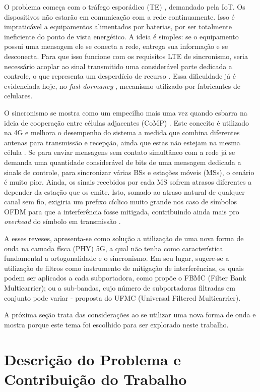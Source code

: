 \par O problema começa com o tráfego esporádico (TE) \cite{Wild}, demandado pela IoT. Os dispositivos não estarão em comunicação com a rede continuamente. Isso é impraticável a equipamentos alimentados por baterias, por ser totalmente ineficiente do ponto de vista energético. A ideia é simples: se o equipamento possui uma mensagem ele se conecta a rede, entrega sua informação e se desconecta. Para que isso funcione com os requisitos LTE de sincronismo, seria necessário acoplar ao sinal transmitido uma considerável parte dedicada a controle, o que representa um desperdício de recurso \cite{Wunder}. Essa dificuldade já é evidenciada hoje, no \textit{fast dormancy} \cite{Zhao}, mecanismo utilizado por fabricantes de celulares.    
\par O sincronismo se mostra como um empecilho mais uma vez quando esbarra na ideia de cooperação entre células adjacentes (CoMP) \cite{Wunder}. Este conceito é utilizado na 4G e melhora o desempenho do sistema a medida que combina diferentes antenas para transmissão e recepção, ainda que estas não estejam na mesma célula \cite{DLee}. Se para enviar mensagens sem contato simultâneo com a rede já se demanda uma quantidade considerável de bits de uma mensagem dedicada a sinals de controle, para sincronizar várias BSs e estações móveis (MSs), o cenário é muito pior. Ainda, os sinais recebidos por cada MS sofrem atrasos diferentes a depender da estação que os emite. Isto, somado ao atraso natural de qualquer canal sem fio, exigiria um prefixo cíclico muito grande nos caso de símbolos OFDM para que a interferência fosse mitigada, contribuindo ainda mais pro \textit{overhead} do símbolo em transmissão \cite{Wunder}. 
\par A esses reveses, apresenta-se como solução a utilização de uma nova forma de onda na camada físca (PHY) 5G, a qual não tenha como característica fundamental a ortogonalidade e o sincronismo. Em seu lugar, sugere-se a utilização de filtros como instrumento de mitigação de interferências, os quais podem ser aplicados a cada subportadora, como propõe o FBMC (Filter Bank Multicarrier); ou a sub-bandas, cujo número de subportadoras filtradas em conjunto pode variar - proposta do UFMC (Universal Filtered Multicarrier). 
\par A próxima seção trata das considerações ao se utilizar uma nova forma de onda e mostra porque este tema foi escolhido para ser explorado neste trabalho. 

\section{Descrição do Problema e Contribuição do Trabalho}
 
